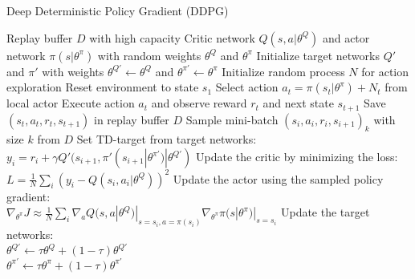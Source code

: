 \begin{algorithm} [H]
	\caption{Deep Deterministic Policy Gradient (DDPG)}\label{DDPG-algo}
	\begin{algorithmic}[1]
		\REQUIRE Replay buffer $\mathit{D}$ with high capacity
		\REQUIRE Critic network $Q(s,a|\theta^Q)$ and actor network $\pi(s|\theta^\pi)$ with random weights $\theta^Q$ and $\theta^\pi$
		\REQUIRE Initialize target networks $Q'$ and $\pi'$ with weights $\theta^{Q'}\leftarrow\theta^Q$ and $\theta^{\pi'}\leftarrow\theta^\pi$
		\STATE Initialize random process $\mathit{N}$ for action exploration
		\STATE Reset environment to state $s_1$
		\STATE Select action $a_t = \pi(s_t|\theta^\pi) + \mathit{N}_t$ from local actor
		\STATE Execute action $a_t$ and observe reward $r_t$ and next state $s_{t+1}$
		\STATE Save $(s_t, a_t, r_t,s_{t+1})$ in replay buffer $D$
		\STATE Sample mini-batch $(s_i, a_i, r_i,s_{i+1})_k$ with size $k$ from $D$
		\STATE Set TD-target from target networks:\\
		\qquad $y_i = r_i + \gamma Q'(s_{i+1}, \pi'(s_{i+1}|\theta^{\pi'})|\theta^{Q'})$
		\STATE Update the critic by minimizing the loss:\\
		\qquad $L=\frac{1}{N}\sum_i(y_i - Q(s_i,a_i|\theta^Q))^2$
		\STATE Update the actor using the sampled policy gradient:\\ 			\qquad $\nabla_{\theta^\pi}J \approx \frac{1}{N} \sum_i \nabla_a Q(s,a|\theta^Q)|_{s=s_i, a=\pi(s_i)}\nabla_{\theta^\pi}\pi(s|\theta^\pi)|_{s=s_i}$
		\STATE Update the target networks:\\
		\qquad $\theta^{Q'}\leftarrow \tau \theta^Q + (1-\tau)\theta^{Q'}$\\
		\qquad $\theta^{\pi'}\leftarrow \tau \theta^\pi + (1-\tau)\theta^{\pi'}$
		\ENDFOR
		\ENDFOR
	\end{algorithmic}
\end{algorithm}


